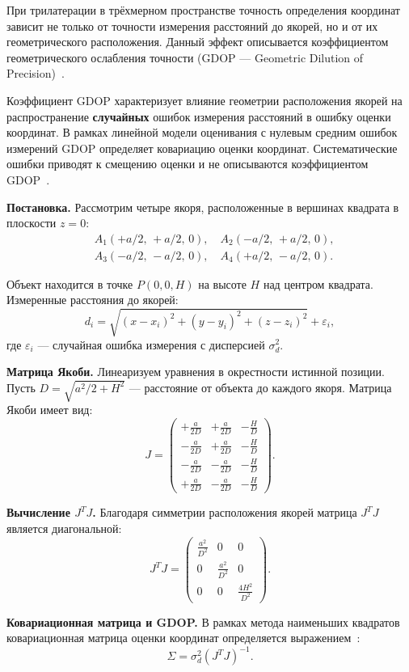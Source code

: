 При трилатерации в трёхмерном пространстве точность определения координат зависит не только от точности измерения расстояний до якорей, но и от их геометрического расположения. Данный эффект описывается коэффициентом геометрического ослабления точности (GDOP — Geometric Dilution of Precision)~\cite{kaplan2005,misra2006}.

Коэффициент GDOP характеризует влияние геометрии расположения якорей на распространение \textbf{случайных} ошибок измерения расстояний в ошибку оценки координат. В рамках линейной модели оценивания с нулевым средним ошибок измерений GDOP определяет ковариацию оценки координат. Систематические ошибки приводят к смещению оценки и не описываются коэффициентом GDOP~\cite{kay1993,hayes1996}.

\textbf{Постановка.} Рассмотрим четыре якоря, расположенные в вершинах квадрата в плоскости $z=0$:
$$
\begin{aligned}
&A_1(+a/2,\, +a/2,\, 0), \quad A_2(-a/2,\, +a/2,\, 0),\\
&A_3(-a/2,\, -a/2,\, 0), \quad A_4(+a/2,\, -a/2,\, 0).
\end{aligned}
$$

Объект находится в точке $P(0, 0, H)$ на высоте $H$ над центром квадрата. Измеренные расстояния до якорей:
$$
d_i = \sqrt{(x-x_i)^2 + (y-y_i)^2 + (z-z_i)^2} + \varepsilon_i,
$$
где $\varepsilon_i$ — случайная ошибка измерения с дисперсией $\sigma_d^2$.

\textbf{Матрица Якоби.} Линеаризуем уравнения в окрестности истинной позиции. Пусть $D = \sqrt{a^2/2 + H^2}$ — расстояние от объекта до каждого якоря. Матрица Якоби имеет вид:
$$
J =
\begin{pmatrix}
+\frac{a}{2D} & +\frac{a}{2D} & -\frac{H}{D} \\
-\frac{a}{2D} & +\frac{a}{2D} & -\frac{H}{D} \\
-\frac{a}{2D} & -\frac{a}{2D} & -\frac{H}{D} \\
+\frac{a}{2D} & -\frac{a}{2D} & -\frac{H}{D}
\end{pmatrix}.
$$

\textbf{Вычисление $J^T J$.} Благодаря симметрии расположения якорей матрица $J^T J$ является диагональной:
$$
J^T J =
\begin{pmatrix}
\frac{a^2}{D^2} & 0 & 0 \\
0 & \frac{a^2}{D^2} & 0 \\
0 & 0 & \frac{4H^2}{D^2}
\end{pmatrix}.
$$

\textbf{Ковариационная матрица и GDOP.} В рамках метода наименьших квадратов ковариационная матрица оценки координат определяется выражением~\cite{hayes1996,kay1993}:
$$
\Sigma = \sigma_d^2 (J^T J)^{-1}.
$$

